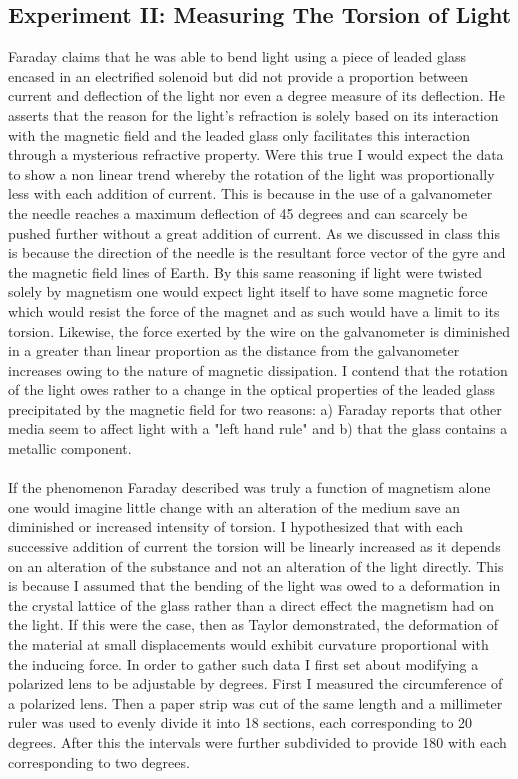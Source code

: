 \documentclass{article}
\begin{document}
\subsection{Experiment II: Measuring The Torsion of Light}
Faraday claims that he was able to bend light using a piece of leaded glass encased in an electrified solenoid but did not provide a proportion between current and deflection of the light nor even a degree measure of its deflection. He asserts that the reason for the light's refraction is solely based on its interaction with the magnetic field and the leaded glass only facilitates this interaction through a mysterious refractive property. Were this true I would expect the data to show a non linear trend whereby the rotation of the light was proportionally less with each addition of current. This is because in the use of a galvanometer the needle reaches a maximum deflection of 45 degrees and can scarcely be pushed further without a great addition of current. As we discussed in class this is because the direction of the needle is the resultant force vector of the gyre and the magnetic field lines of Earth. By this same reasoning if light were twisted solely by magnetism one would expect light itself to have some magnetic force which would resist the force of the magnet and as such would have a limit to its torsion. Likewise, the force exerted by the wire on the galvanometer is diminished in a greater than linear proportion as the distance from the galvanometer increases owing to the nature of magnetic dissipation. I contend that the rotation of the light owes rather to a change in the optical properties of the leaded glass precipitated by the magnetic field for two reasons: a) Faraday reports that other media seem to affect light with a "left hand rule" and b) that the glass contains a metallic component. \paragraph{}
If the phenomenon Faraday described was truly a function of magnetism alone one would imagine little change with an alteration of the medium save an diminished or increased intensity of torsion. I hypothesized that with each successive addition of current the torsion will be linearly increased as it depends on an alteration of the substance and not an alteration of the light directly. This is because I assumed that the bending of the light was owed to a deformation in the crystal lattice of the glass rather than a direct effect the magnetism had on the light. If this were the case, then as Taylor demonstrated, the deformation of the material at small displacements would exhibit curvature proportional with the inducing force. In order to gather such data I first set about modifying a polarized lens to be adjustable by degrees. First I measured the circumference of a polarized lens. Then a paper strip was cut of the same length and a millimeter ruler was used to evenly divide it into 18 sections, each corresponding to 20 degrees. After this the intervals were further subdivided to provide 180 with each corresponding to two degrees. 
\end{document}
